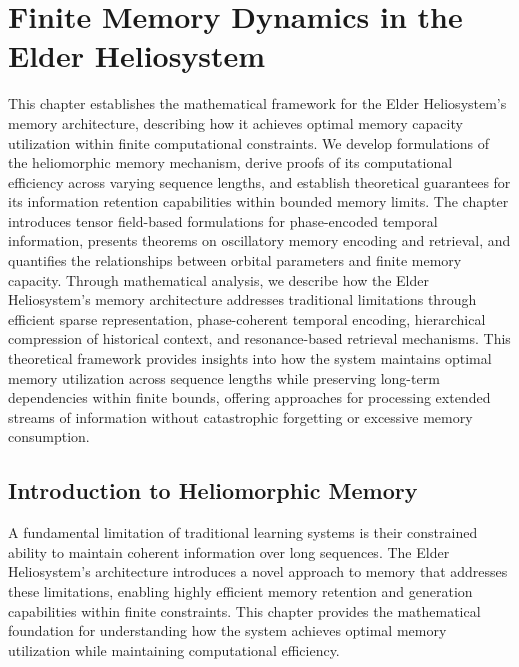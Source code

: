 \chapter{Finite Memory Dynamics in the Elder Heliosystem}

\begin{tcolorbox}[colback=DarkSkyBlue!5!white,colframe=DarkSkyBlue!75!black,title=Chapter Summary]
This chapter establishes the mathematical framework for the Elder Heliosystem's memory architecture, describing how it achieves optimal memory capacity utilization within finite computational constraints. We develop formulations of the heliomorphic memory mechanism, derive proofs of its computational efficiency across varying sequence lengths, and establish theoretical guarantees for its information retention capabilities within bounded memory limits. The chapter introduces tensor field-based formulations for phase-encoded temporal information, presents theorems on oscillatory memory encoding and retrieval, and quantifies the relationships between orbital parameters and finite memory capacity. Through mathematical analysis, we describe how the Elder Heliosystem's memory architecture addresses traditional limitations through efficient sparse representation, phase-coherent temporal encoding, hierarchical compression of historical context, and resonance-based retrieval mechanisms. This theoretical framework provides insights into how the system maintains optimal memory utilization across sequence lengths while preserving long-term dependencies within finite bounds, offering approaches for processing extended streams of information without catastrophic forgetting or excessive memory consumption.
\end{tcolorbox}

\section{Introduction to Heliomorphic Memory}

A fundamental limitation of traditional learning systems is their constrained ability to maintain coherent information over long sequences. The Elder Heliosystem's architecture introduces a novel approach to memory that addresses these limitations, enabling highly efficient memory retention and generation capabilities within finite constraints. This chapter provides the mathematical foundation for understanding how the system achieves optimal memory utilization while maintaining computational efficiency.

